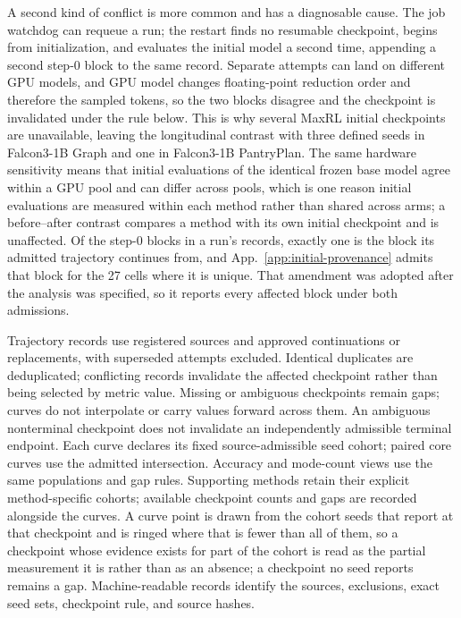 \documentclass{article}
\newcommand{\1}{\mathbf 1}
\theoremstyle{remark}
\theoremstyle{definition}
\theoremstyle{plain}
\begin{document}
A second kind of conflict is more common and has a diagnosable cause. The job
watchdog can requeue a run; the restart finds no resumable checkpoint, begins
from initialization, and evaluates the initial model a second time, appending a
second step-0 block to the same record. Separate attempts can land on different
GPU models, and GPU model changes floating-point reduction order and therefore
the sampled tokens, so the two blocks disagree and the checkpoint is invalidated
under the rule below. This is why several MaxRL initial checkpoints are
unavailable, leaving the longitudinal contrast with three defined seeds in
Falcon3-1B Graph and one in Falcon3-1B PantryPlan. The same hardware
sensitivity means that initial evaluations of the identical frozen base model
agree within a GPU pool and can differ across pools, which is one reason
initial evaluations are measured within each method rather than shared across
arms; a before--after contrast compares a method with its own initial
checkpoint and is unaffected. Of the step-0 blocks in a run's records, exactly one is the block its admitted
trajectory continues from, and App.~\ref{app:initial-provenance} admits that
block for the 27 cells where it is unique. That amendment was adopted after the
analysis was specified, so it reports every affected block under both
admissions.

Trajectory records use registered sources and approved continuations or
replacements, with superseded attempts excluded. Identical duplicates are
deduplicated; conflicting records invalidate the affected checkpoint rather
than being selected by metric value. Missing or ambiguous checkpoints remain gaps;
curves do not interpolate or carry values forward across them. An ambiguous
nonterminal checkpoint does not invalidate an independently admissible
terminal endpoint. Each curve declares its fixed source-admissible seed cohort; paired core
curves use the admitted intersection. Accuracy and mode-count views use
the same populations and gap rules. Supporting methods retain their
explicit method-specific cohorts; available checkpoint counts and gaps
are recorded alongside the curves. A curve point is drawn from the cohort seeds
that report at that checkpoint and is ringed where that is fewer than all of
them, so a checkpoint whose evidence exists for part of the cohort is read as
the partial measurement it is rather than as an absence; a checkpoint no seed
reports remains a gap. Machine-readable records identify the
sources, exclusions, exact seed sets, checkpoint rule, and source hashes.
\end{document}
